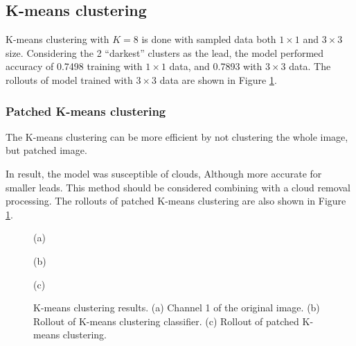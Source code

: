 \documentclass{article}
\begin{document}
    \subsection{K-means clustering} \label{sec:kmeans}
        K-means clustering with $K = 8$ is done with sampled data
        both $1\times 1$ and $3\times 3$ size.
        Considering the 2 ``darkest'' clusters as the lead,
        the model performed accuracy of 0.7498 training with $1\times 1$ data,
        and 0.7893 with $3\times 3$ data.
        The rollouts of model trained with $3\times 3$ data
        are shown in Figure \ref{fig:kmeans}.

        \subsubsection{Patched K-means clustering}
            The K-means clustering can be more efficient by
            not clustering the whole image, but patched image.
            
            In result, the model was susceptible of clouds,
            Although more accurate for smaller leads.
            This method should be considered combining
            with a cloud removal processing.
            The rollouts of patched K-means clustering are also
            shown in Figure \ref{fig:kmeans}.

        \begin{figure}[ht]
            \centering
            \begin{minipage}{0.32\hsize}
                \centering
                \caption*{(a)}
            \end{minipage}
            \begin{minipage}{0.32\hsize}
                \centering
                \caption*{(b)}
            \end{minipage}
            \begin{minipage}{0.32\hsize}
                \centering
                \caption*{(c)}
            \end{minipage}
            \caption{
                K-means clustering results.
                (a) Channel 1 of the original image.
                (b) Rollout of K-means clustering classifier.
                (c) Rollout of patched K-means clustering.
            }
            \label{fig:kmeans}
        \end{figure}
\end{document}
